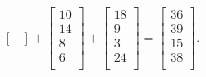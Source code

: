 \begin{eks}
$$\begin{bmatrix}
\end{bmatrix}
+
\begin{bmatrix}
10\\
14\\
8\\
6\\
\end{bmatrix}
+
\begin{bmatrix}
18\\
9\\
3\\
24\\
\end{bmatrix}
=
\begin{bmatrix}
36\\
39\\
15\\
38\\
\end{bmatrix}.
$$
\end{eks}